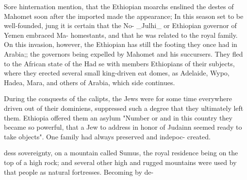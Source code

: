 Sore hinternation mention, that the Ethiopian moarchs enslined the destes of Mahomet soon after the imported made the appearance; In this season set to be well-founded, jung it is certain that the No- \_Julhi\_ or Ethiopian governor of Yemen embraced Ma- homestants, and that he was related to the royal family. On this invasion, however, the Ethiopian has still the footing they once had in Arabia;; the governors being expelled by Mahomet and his succursers. They fled to the African state of the Had se with members Ethiopians of their subjects, where they erected several small king-driven eat domes, as Adelaide, Wypo, Hadea, Mara, and others of Arabia, which side continues.\par\medskip
During the conquests of the calipts, the Jews were for some time everywhere driven out of their dominiens, suppressed such a degree that they ultimately left them. Ethiopia offered them an asylum "Number or and in this country they became so powerful, that a Jew to address in honor of Judainn seemed ready to take objects". One family had always preserved and indepoc- created.\par\medskip
dess sovereignty, on a mountain called Sumus, the royal residence being on the top of a high rock; and several other high and rugged mountains were used by that people as natural fortresses. Becoming by de-\par\medskip
